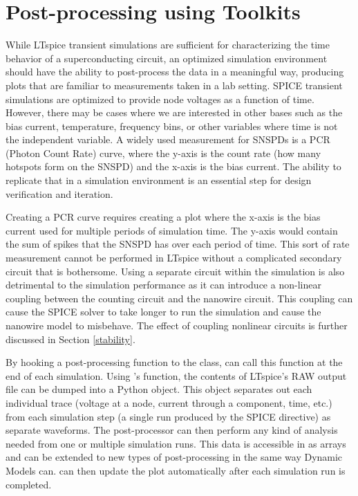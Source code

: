 \section{Post-processing using  Toolkits}

While LTspice transient simulations are sufficient for characterizing the time behavior of a superconducting 
circuit, an optimized simulation environment should have the ability to post-process the data 
in a meaningful way, producing plots that are familiar to measurements taken in a lab setting.
SPICE transient simulations are optimized to provide
 node voltages as a function of time. However, there may be cases where we are interested in other bases such as the bias current, temperature, frequency bins, or other variables where time is not the independent variable. A widely used measurement for SNSPDs is a PCR (Photon Count Rate) curve, where
the y-axis is the count rate (how many hotspots form on the SNSPD) and the x-axis is the bias current. The ability to replicate that in a simulation environment is an essential step for
design verification and iteration.

Creating a PCR curve requires creating a plot where the x-axis is the bias current used for multiple
periods of simulation time. The y-axis would contain the sum of spikes that the SNSPD has over each period
of time. This sort of rate measurement cannot be performed in LTspice without a complicated secondary circuit
that is bothersome. Using a separate circuit within the simulation is also detrimental to the simulation
performance as it can introduce a non-linear coupling between the counting circuit and the nanowire circuit. 
This coupling can cause the SPICE solver to take longer to run the simulation and cause the nanowire model to
misbehave. The effect of coupling nonlinear circuits is further discussed in Section \ref{stability}.

By hooking a post-processing function to the  class,  can call this 
function at the end of each simulation. Using 's 
function, the contents of LTspice's RAW output file can be dumped into a Python object. This object
separates out each individual trace (voltage at a node, current through a component, time, etc.)
from each simulation step (a single run produced by the  SPICE directive) as separate waveforms. The 
post-processor can then perform any kind of analysis needed from one or multiple simulation runs.
This data is accessible in  as
 arrays and can be extended to new types of post-processing in the same way Dynamic Models can.  can then update the plot automatically after each simulation run is completed.

